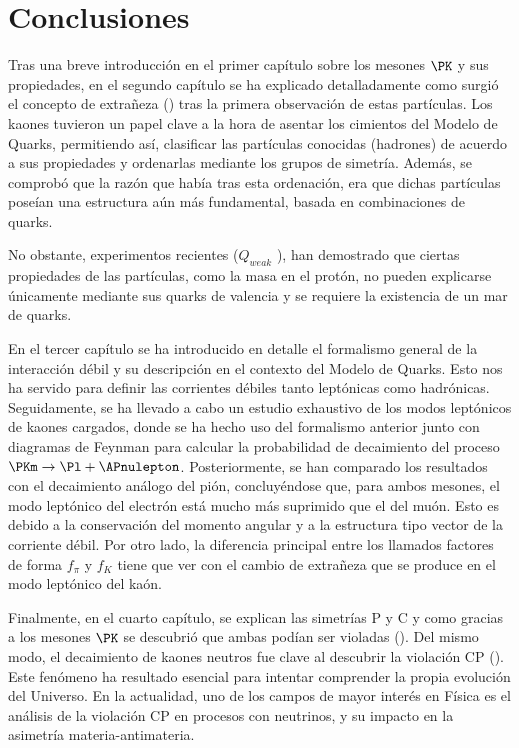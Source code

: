 \chapter{Conclusiones}\label{cap:conclusions}

Tras una breve introducción en el primer capítulo sobre los mesones $\PK$ y sus propiedades, en el segundo capítulo se ha explicado detalladamente como surgió el concepto de extrañeza (\cite{Nature1, Nishijima1955, Pais}) tras la primera observación de estas partículas. Los kaones tuvieron un papel clave a la hora de asentar los cimientos del Modelo de Quarks, permitiendo así, clasificar las partículas conocidas (hadrones) de acuerdo a sus propiedades y ordenarlas mediante los grupos de simetría. Además, se comprobó que la razón que había tras esta ordenación, era que dichas partículas poseían una estructura aún más fundamental, basada en combinaciones de quarks.

No obstante, experimentos recientes ($Q_{weak}$ \cite{nuruzzaman, carlini}), han demostrado que ciertas propiedades de las partículas, como la masa en el protón, no pueden explicarse únicamente mediante sus quarks de valencia y se requiere la existencia de un mar de quarks.

En el tercer capítulo se ha introducido en detalle el formalismo general de la interacción débil y su descripción en el contexto del Modelo de Quarks. Esto nos ha servido para definir las corrientes débiles tanto leptónicas como hadrónicas. Seguidamente, se ha llevado a cabo un estudio exhaustivo de los modos leptónicos de kaones cargados, donde se ha hecho uso del formalismo anterior junto con diagramas de Feynman para calcular la probabilidad de decaimiento del proceso $\PKm \rightarrow \Pl + \APnulepton$. Posteriormente, se han comparado los resultados con el decaimiento análogo del pión, concluyéndose que, para ambos mesones, el modo leptónico del electrón está mucho más suprimido que el del muón. Esto es debido a la conservación del momento angular y a la estructura tipo vector de la corriente débil. Por otro lado, la diferencia principal entre los llamados factores de forma $f_{\pi}$ y $f_{K}$ tiene que ver con el cambio de extrañeza que se produce en el modo leptónico del kaón.

Finalmente, en el cuarto capítulo, se explican las simetrías P y C y como gracias a los mesones $\PK$ se descubrió que ambas podían ser violadas (\cite{Wu1957}). Del mismo modo, el decaimiento de kaones neutros fue clave al descubrir la violación CP (\cite{Cronin}). Este fenómeno ha resultado esencial para intentar comprender la propia evolución del Universo. En la actualidad, uno de los campos de mayor interés en Física es el análisis de la violación CP en procesos con neutrinos, y su impacto en la asimetría materia-antimateria.
